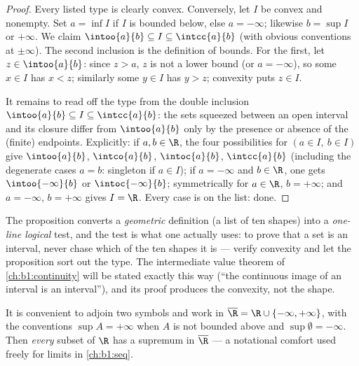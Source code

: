 \begin{proof}
Every listed type is clearly convex. Conversely, let $I$ be convex and
nonempty. Set $a = \inf I$ if $I$ is bounded below, else $a =
-\infty$; likewise $b = \sup I$ or $+\infty$. We claim $\intoo{a}{b}
\subseteq I \subseteq \intcc{a}{b}$ (with obvious conventions at
$\pm\infty$). The second inclusion is the definition of bounds. For
the first, let $z \in \intoo{a}{b}$: since $z > a$, $z$ is not a
lower bound (or $a = -\infty$), so some $x \in I$ has $x < z$;
similarly some $y \in I$ has $y > z$; convexity puts $z \in I$.

It remains to read off the type from the double inclusion
$\intoo{a}{b} \subseteq I \subseteq \intcc{a}{b}$: the sets
squeezed between an open interval and its closure differ from
$\intoo{a}{b}$ only by the presence or absence of the (finite)
endpoints. Explicitly: if $a, b \in \R$, the four possibilities
for $(a \in I,\ b \in I)$ give $\intoo{a}{b}$, $\intco{a}{b}$,
$\intoc{a}{b}$, $\intcc{a}{b}$ (including the degenerate cases
$a = b$: singleton if $a \in I$); if $a = -\infty$ and $b \in
\R$, one gets $\intoo{-\infty}{b}$ or $\intoc{-\infty}{b}$;
symmetrically for $a \in \R$, $b = +\infty$; and $a = -\infty$,
$b = +\infty$ gives $I = \R$. Every case is on the list: done.
\end{proof}

\begin{remark}
The proposition converts a \emph{geometric} definition (a list
of ten shapes) into a \emph{one-line logical} test, and the test
is what one actually uses: to prove that a set is an interval,
never chase which of the ten shapes it is --- verify convexity
and let the proposition sort out the type. The intermediate
value theorem of \cref{ch:b1:continuity} will be stated exactly
this way (``the continuous image of an interval is an
interval''), and its proof produces the convexity, not the
shape.
\end{remark}

\begin{remark}
It is convenient to adjoin two symbols and work in $\overline\R = \R
\cup \{-\infty, +\infty\}$, with the conventions $\sup A = +\infty$
when $A$ is not bounded above and $\sup \emptyset = -\infty$. Then
\emph{every} subset of $\R$ has a supremum in $\overline\R$ --- a
notational comfort used freely for limits in \cref{ch:b1:seq}.
\end{remark}

